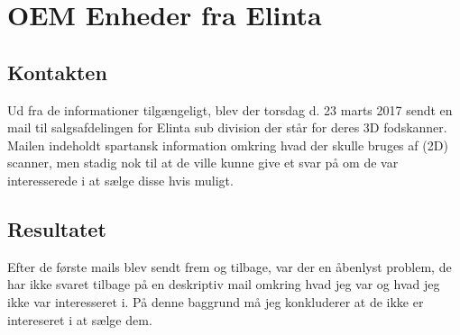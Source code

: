 \section{OEM Enheder fra Elinta}

\subsection{Kontakten}
Ud fra de informationer tilgængeligt, blev der torsdag d. 23 marts 2017 sendt en mail til salgsafdelingen for Elinta sub division der står for deres 3D fodskanner. Mailen indeholdt spartansk information omkring hvad der skulle bruges af (2D) scanner, men stadig nok til at de ville kunne give et svar på om de var interesserede i at sælge disse hvis muligt.

\subsection{Resultatet}
Efter de første mails blev sendt frem og tilbage, var der en åbenlyst problem, de har ikke svaret tilbage på en deskriptiv mail omkring hvad jeg var og hvad jeg ikke var interesseret i. På denne baggrund må jeg konkluderer at de ikke er intereseret i at sælge dem.